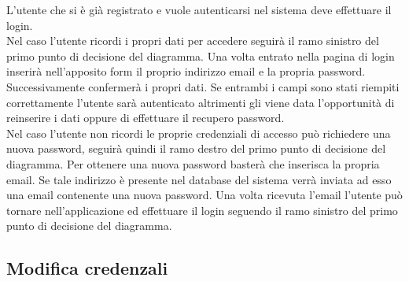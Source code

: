 L'utente che si è già registrato e vuole autenticarsi nel sistema deve effettuare il login. \\
Nel caso l'utente ricordi i propri dati per accedere seguirà il ramo sinistro del primo punto di decisione del diagramma. Una volta entrato nella pagina di login inserirà nell'apposito form il proprio indirizzo email e la propria password. Successivamente confermerà i propri dati. Se entrambi i campi sono stati riempiti correttamente l'utente sarà autenticato altrimenti gli viene data l'opportunità di reinserire i dati oppure di effettuare il recupero password. \\
Nel caso l'utente non ricordi le proprie credenziali di accesso può richiedere una nuova password, seguirà quindi il ramo destro del primo punto di decisione del diagramma. Per ottenere una nuova password basterà che inserisca la propria email. Se tale indirizzo è presente nel database del sistema verrà inviata ad esso una email contenente una nuova password. Una volta ricevuta l'email l'utente può tornare nell'applicazione ed effettuare il login seguendo il ramo sinistro del primo punto di decisione del diagramma.

\subsection{Modifica credenzali}


